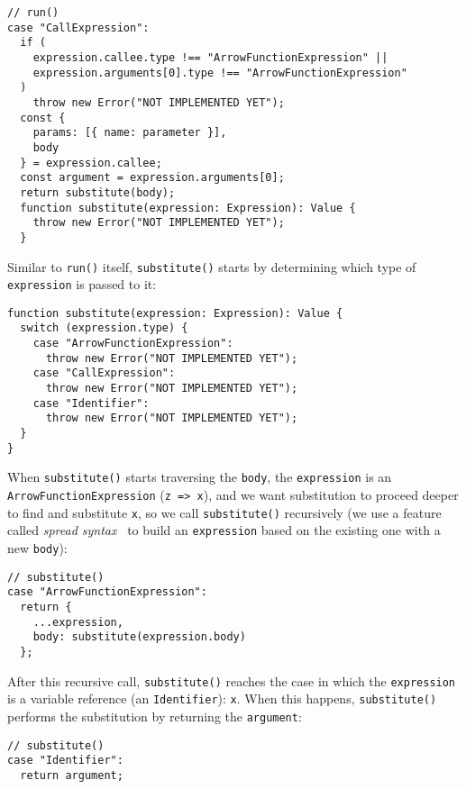 \documentclass[12pt, oneside]{book}
\begin{document}
\begin{verbatim}
// run()
case "CallExpression":
  if (
    expression.callee.type !== "ArrowFunctionExpression" ||
    expression.arguments[0].type !== "ArrowFunctionExpression"
  )
    throw new Error("NOT IMPLEMENTED YET");
  const {
    params: [{ name: parameter }],
    body
  } = expression.callee;
  const argument = expression.arguments[0];
  return substitute(body);
  function substitute(expression: Expression): Value {
    throw new Error("NOT IMPLEMENTED YET");
  }
\end{verbatim}

Similar to \texttt{run()} itself, \texttt{substitute()} starts by determining which type of \texttt{expression} is passed to it:

\begin{verbatim}
function substitute(expression: Expression): Value {
  switch (expression.type) {
    case "ArrowFunctionExpression":
      throw new Error("NOT IMPLEMENTED YET");
    case "CallExpression":
      throw new Error("NOT IMPLEMENTED YET");
    case "Identifier":
      throw new Error("NOT IMPLEMENTED YET");
  }
}
\end{verbatim}

When \texttt{substitute()} starts traversing the \texttt{body}, the \texttt{expression} is an \texttt{ArrowFunctionExpression} (\texttt{z => x}), and we want substitution to proceed deeper to find and substitute \texttt{x}, so we call \texttt{substitute()} recursively (we use a feature called \emph{spread syntax}~\cite{spread-syntax} to build an \texttt{expression} based on the existing one with a new \texttt{body}):

\begin{verbatim}
// substitute()
case "ArrowFunctionExpression":
  return {
    ...expression,
    body: substitute(expression.body)
  };
\end{verbatim}

After this recursive call, \texttt{substitute()} reaches the case in which the \texttt{expression} is a variable reference (an \texttt{Identifier}): \texttt{x}. When this happens, \texttt{substitute()} performs the substitution by returning the \texttt{argument}:

\begin{verbatim}
// substitute()
case "Identifier":
  return argument;
\end{verbatim}
\end{document}
